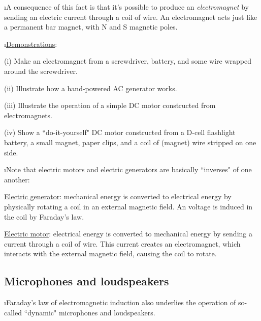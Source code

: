 \i A consequence of this fact is that it's possible to produce an 
{\em electromagnet} by sending an electric current through a coil of wire.
An electromagnet acts just like a permanent bar magnet, with N and S 
magnetic poles.

\i \underline{Demonstrations}:

(i) Make an electromagnet from a screwdriver, battery, and
some wire wrapped around the screwdriver.

(ii) Illustrate how a hand-powered AC generator works.

(iii) Illustrate the operation of a simple DC motor constructed
from electromagnets.

(iv) Show a ``do-it-yourself" DC motor constructed from a D-cell
flashlight battery, a small magnet, paper clips, and a coil of (magnet)
wire stripped on one side.

\i Note that electric motors and electric generators are basically 
``inverses" of one another:

\underline{Electric generator}: 
mechanical energy is converted to electrical energy
by physically rotating a coil in an external magnetic field. 
An voltage is induced in the coil by Faraday's law.

\underline{Electric motor}: 
electrical energy is converted to mechanical energy 
by sending a current through a coil of wire.  
This current creates an electromagnet, which interacts with the 
external magnetic field, causing the coil to rotate.

\ei

\subsection{Microphones and loudspeakers}

\bi

\i Faraday's law of electromagnetic induction also underlies the
operation of so-called ``dynamic" microphones and loudspeakers.

